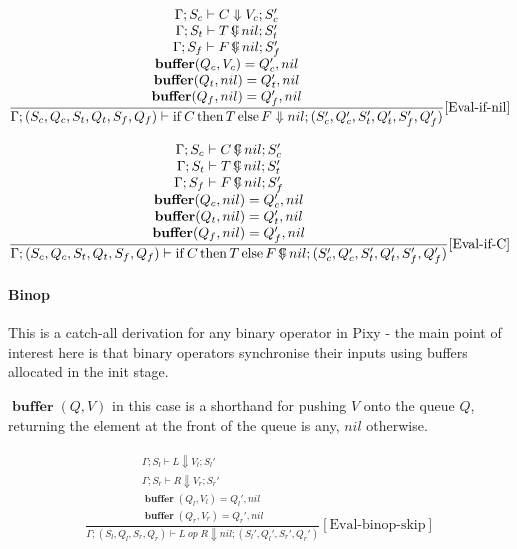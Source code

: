 \documentclass{scrartcl}
\DeclareMathOperator{\ifop}{if}
\DeclareMathOperator{\thenop}{then}
\DeclareMathOperator{\elseop}{else}
\DeclareMathOperator{\ceval}{\overset{C}{\smash{\Downarrow}}}
\DeclareMathOperator{\buffer}{\mathbf{buffer}}
\begin{document}
    \begin{align*}
    \frac{
        \begin{matrix}
        \Gamma; S_c \vdash C \Downarrow V_c; S_c' \\
        \Gamma; S_t \vdash T \ceval nil; S_t' \\
        \Gamma; S_f \vdash F \ceval nil; S_f' \\
        \buffer(Q_c, V_c) = Q_c', nil \\
        \buffer(Q_t, nil) = Q_t', nil \\
        \buffer(Q_f, nil) = Q_f', nil
        \end{matrix}
    }{
        \Gamma; (S_c, Q_c, S_t, Q_t, S_f, Q_f) \vdash \ifop C \thenop T \elseop F \Downarrow nil; (S_c', Q_c', S_t', Q_t', S_f', Q_f')
    }[\text{Eval-if-nil}]
    \end{align*}
    
    \begin{align*}
    \frac{
        \begin{matrix}
        \Gamma; S_c \vdash C \ceval nil; S_c' \\
        \Gamma; S_t \vdash T \ceval nil; S_t' \\
        \Gamma; S_f \vdash F \ceval nil; S_f' \\
        \buffer(Q_c, nil) = Q_c', nil \\
        \buffer(Q_t, nil) = Q_t', nil \\
        \buffer(Q_f, nil) = Q_f', nil
        \end{matrix}
    }{
        \Gamma; (S_c, Q_c, S_t, Q_t, S_f, Q_f) \vdash \ifop C \thenop T \elseop F \ceval nil; (S_c', Q_c', S_t', Q_t', S_f', Q_f')
    }[\text{Eval-if-C}]
    \end{align*}
    
    \paragraph{Binop}
    
    This is a catch-all derivation for any binary operator in Pixy - the main point of interest here is that binary operators synchronise their inputs using buffers allocated in the init stage.
    
    $\buffer(Q, V)$ in this case is a shorthand for pushing $V$ onto the queue $Q$, returning the element at the front of the queue is any, $nil$ otherwise.
    
    \begin{align*}
    \frac{
        \begin{matrix}
        \Gamma; S_l \vdash L \Downarrow V_l; S_l' \\
        \Gamma; S_r \vdash R \Downarrow V_r; S_r' \\
        \buffer(Q_l, V_l) = Q_l', nil \\
        \buffer(Q_r, V_r) = Q_r', nil
        \end{matrix}
    }{
        \Gamma; (S_l, Q_l, S_r, Q_r) \vdash L \; op \; R \Downarrow nil; (S_l', Q_l', S_r', Q_r')
    }[\text{Eval-binop-skip}]
    \end{align*}
    
\end{document}
